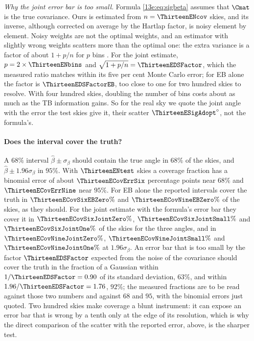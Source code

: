 \emph{Why the joint error bar is too small.} Formula \eqref{13e:eq:sigbeta} assumes that $\Cmat$ is the true
covariance. Ours is estimated from $n=\ThirteenENcov$ skies, and its inverse, although corrected on average by
the Hartlap factor, is noisy element by element. Noisy weights are not the optimal weights, and an estimator
with slightly wrong weights scatters more than the optimal one: the extra variance is a factor of about
$1+p/n$ for $p$ bins \cite{DodelsonSchneider2013}. For the joint estimate, $p=2\times\ThirteenENbins$ and
$\sqrt{1+p/n}=\ThirteenEDSFactor$, which the measured ratio matches within its five per cent Monte Carlo
error; for EB alone the factor is $\ThirteenEDSFactorEB$, too close to one for two hundred skies to resolve.
With four hundred skies, doubling the number of bins costs about as much as the TB information gains. So for the
real sky we quote the joint angle with the error the test skies give it, their scatter
$\ThirteenESigAdopt^\circ$, not the formula's.

\paragraph{Does the interval cover the truth?} A $68\%$ interval $\hat\beta\pm\sigma_\beta$ should contain
the true angle in $68\%$ of the skies, and $\hat\beta\pm1.96\sigma_\beta$ in $95\%$. With $\ThirteenENtest$ skies
a coverage fraction has a binomial error of about $\ThirteenECovErrSix$ percentage points near $68\%$ and
$\ThirteenECovErrNine$ near $95\%$. For EB alone the reported intervals cover the truth in
$\ThirteenECovSixEBZero\%$ and $\ThirteenECovNineEBZero\%$ of the skies, as they should. For the joint
estimate with the formula's error bar they cover it in $\ThirteenECovSixJointZero\%$,
$\ThirteenECovSixJointSmall\%$ and $\ThirteenECovSixJointOne\%$ of the skies for the three angles, and in
$\ThirteenECovNineJointZero\%$, $\ThirteenECovNineJointSmall\%$ and $\ThirteenECovNineJointOne\%$ at
$1.96\sigma_\beta$. An error bar that is too small by the factor $\ThirteenEDSFactor$ expected from the noise of the covariance should cover the truth in
the fraction of a Gaussian within $1/\ThirteenEDSFactor=0.90$ of its standard deviation, $63\%$, and within
$1.96/\ThirteenEDSFactor=1.76$, $92\%$; the measured fractions are to be read against those two numbers and against $68$ and $95$, with the
binomial errors just quoted. Two hundred skies make coverage a blunt instrument: it can expose an error bar that
is wrong by a tenth only at the edge of its resolution, which is why the direct comparison of the scatter with
the reported error, above, is the sharper test.

